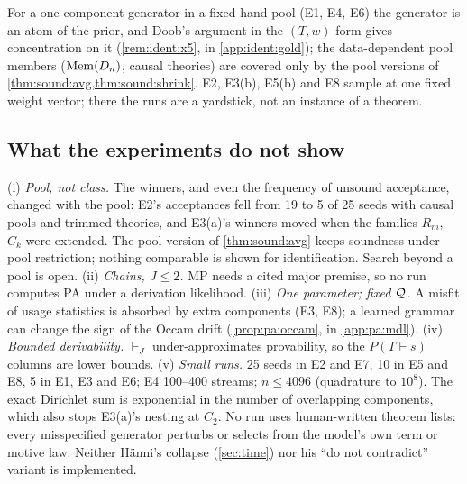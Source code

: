 \noindent For a one-component generator in a fixed hand pool (E1, E4, E6) the generator is an atom of the prior, and Doob's argument in the $(T,w)$ form gives concentration on it (\cref{rem:ident:x5}, in \cref{app:ident:gold}); the data-dependent pool members ($\mathrm{Mem}(D_n)$, causal theories) are covered only by the pool versions of \cref{thm:sound:avg,thm:sound:shrink}. E2, E3(b), E5(b) and E8 sample at one fixed weight vector; there the runs are a yardstick, not an instance of a theorem.

\subsection{What the experiments do not show}\label{sec:exp:limits}

\begin{remark}[Limitations]\expbrk{}\label{rem:exp:limits}
(i) \emph{Pool, not class.} The winners, and even the frequency of unsound acceptance, changed with the pool: E2's acceptances fell from 19 to 5 of 25 seeds with causal pools and trimmed theories, and E3(a)'s winners moved when the families $R_m$, $C_k$ were extended. The pool version of \cref{thm:sound:avg} keeps soundness under pool restriction; nothing comparable is shown for identification. Search beyond a pool is open.
(ii) \emph{Chains, $J\le2$.} MP needs a cited major premise, so no run computes PA under a derivation likelihood.
(iii) \emph{One parameter; fixed $\mathcal{Q}$.} A misfit of usage statistics is absorbed by extra components (E3, E8); a learned grammar can change the sign of the Occam drift (\cref{prop:pa:occam}, in \cref{app:pa:mdl}).
(iv) \emph{Bounded derivability.} $\vdash_J$ under-approximates provability, so the $P(T\vdash s)$ columns are lower bounds.
(v) \emph{Small runs.} 25 seeds in E2 and E7, 10 in E5 and E8, 5 in E1, E3 and E6; E4 100--400 streams; $n\le4096$ (quadrature to $10^8$). The exact Dirichlet sum is exponential in the number of overlapping components, which also stops E3(a)'s nesting at $C_2$.
No run uses human-written theorem lists: every misspecified generator perturbs or selects from the model's own term or motive law. Neither H\"anni's collapse (\cref{sec:time}) nor his ``do not contradict'' variant is implemented.
\end{remark}
